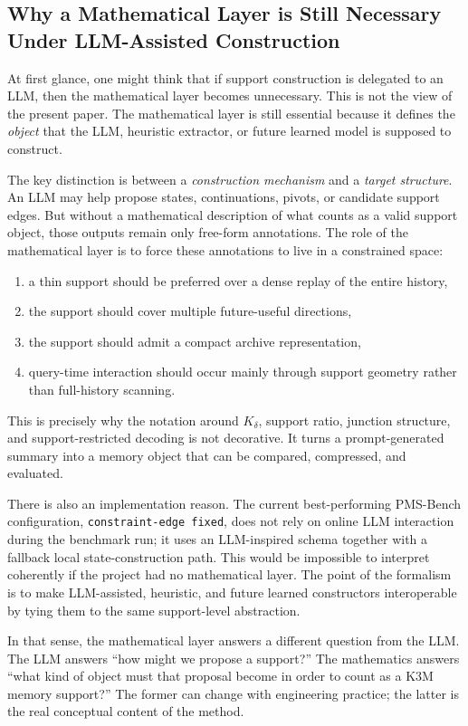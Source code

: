 \documentclass[11pt]{article}
\begin{document}
\subsection{Why a Mathematical Layer is Still Necessary Under LLM-Assisted Construction}
At first glance, one might think that if support construction is delegated to an LLM, then the mathematical layer becomes unnecessary. This is not the view of the present paper. The mathematical layer is still essential because it defines the \emph{object} that the LLM, heuristic extractor, or future learned model is supposed to construct.

The key distinction is between a \emph{construction mechanism} and a \emph{target structure}. An LLM may help propose states, continuations, pivots, or candidate support edges. But without a mathematical description of what counts as a valid support object, those outputs remain only free-form annotations. The role of the mathematical layer is to force these annotations to live in a constrained space:
\begin{enumerate}[leftmargin=1.5em]
\item a thin support should be preferred over a dense replay of the entire history,
\item the support should cover multiple future-useful directions,
\item the support should admit a compact archive representation,
\item query-time interaction should occur mainly through support geometry rather than full-history scanning.
\end{enumerate}

This is precisely why the notation around $K_\delta$, support ratio, junction structure, and support-restricted decoding is not decorative. It turns a prompt-generated summary into a memory object that can be compared, compressed, and evaluated.

There is also an implementation reason. The current best-performing PMS-Bench configuration, \texttt{constraint-edge fixed}, does not rely on online LLM interaction during the benchmark run; it uses an LLM-inspired schema together with a fallback local state-construction path. This would be impossible to interpret coherently if the project had no mathematical layer. The point of the formalism is to make LLM-assisted, heuristic, and future learned constructors interoperable by tying them to the same support-level abstraction.

In that sense, the mathematical layer answers a different question from the LLM. The LLM answers ``how might we propose a support?'' The mathematics answers ``what kind of object must that proposal become in order to count as a K3M memory support?'' The former can change with engineering practice; the latter is the real conceptual content of the method.
\end{document}
